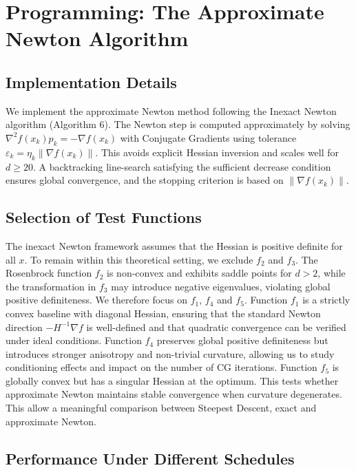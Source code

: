 \documentclass[11pt,a4paper]{article}
\begin{document}
\section{Programming: The Approximate Newton Algorithm}

\subsection{Implementation Details}

We implement the approximate Newton method following the Inexact Newton 
algorithm (Algorithm 6). The Newton step is computed approximately by solving
$
\nabla^2 f(x_k) p_k = -\nabla f(x_k)
$
with Conjugate Gradients using tolerance 
$\varepsilon_k = \eta_k \|\nabla f(x_k)\|$. This avoids explicit Hessian inversion and scales well for $d \ge 20$. A backtracking line-search satisfying the sufficient decrease condition ensures 
global convergence, and the stopping criterion is based on $\|\nabla f(x_k)\|$.


\subsection{Selection of Test Functions}

The inexact Newton framework assumes that the Hessian is positive definite for 
all $x$. To remain within this theoretical setting, we exclude $f_2$ and $f_3$. 
The Rosenbrock function $f_2$ is non-convex and exhibits saddle points for 
$d>2$, while the transformation in $f_3$ may introduce negative eigenvalues, 
violating global positive definiteness.
We therefore focus on $f_1$, $f_4$ and $f_5$. Function $f_1$ is a strictly convex baseline with diagonal 
Hessian, ensuring that the standard Newton direction $-H^{-1}\nabla f$ is 
well-defined and that quadratic convergence can be verified under ideal 
conditions. Function $f_4$ preserves global positive definiteness but introduces stronger anisotropy and non-trivial curvature, allowing us to study conditioning effects and impact on the number of CG iterations. Function $f_5$ is globally convex but has a singular Hessian at the optimum. This tests whether approximate Newton maintains stable convergence when curvature degenerates. This allow a meaningful comparison between Steepest Descent, exact and approximate Newton.


\subsection{Performance Under Different Schedules}
\end{document}
